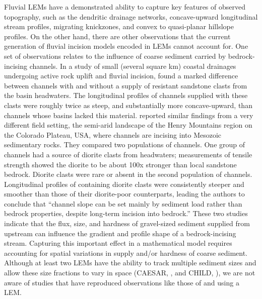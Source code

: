 \documentclass[journal abbreviation, manuscript]{copernicus}
\begin{document}
Fluvial LEMs have a demonstrated ability to capture key features of observed topography, such as the  dendritic drainage networks, concave-upward longitudinal stream profiles, migrating knickzones, and convex to quasi-planar hillslope profiles. On the other hand, there are other observations that the current generation of fluvial incision models encoded in LEMs cannot account for. One set of observations relates to the influence of coarse sediment carried by bedrock-incising channels. In a study of small (several square km) coastal drainages undergoing active rock uplift and fluvial incision, \citet{duvall2004tectonic} found a marked difference between channels with and without a supply of resistant sandstone clasts from the basin headwaters. The longitudinal profiles of channels supplied with these clasts were roughly twice as steep, and substantially more concave-upward, than channels whose basins lacked this material. \citet{johnson2009transport} reported similar findings from a very different field setting, the semi-arid landscape of the Henry Mountains region on the Colorado Plateau, USA, where channels are incising into Mesozoic sedimentary rocks. They compared two populations of channels. One group of channels had a source of diorite clasts from headwaters; measurements of tensile strength showed the diorite to be about 100x stronger than local sandstone bedrock. Diorite clasts were rare or absent in the second population of channels. Longitudinal profiles of  containing diorite clasts were consistently steeper and smoother than those of their diorite-poor counterparts, leading the authors to conclude that ``channel slope can be set mainly by sediment load rather than bedrock properties, despite long-term incision into bedrock.'' These two studies indicate that the flux, size, and hardness of gravel-sized sediment supplied from upstream can influence the gradient and profile shape of a bedrock-incising stream. Capturing this important effect in a mathematical model requires accounting for spatial variations in supply and/or hardness of coarse sediment. Although at least two LEMs have the ability to track multiple sediment sizes and allow these size fractions to vary in space (CAESAR, \citet{coulthard1996cellular}, and CHILD, \citet{tucker2001channel}), we are not aware of studies that have reproduced observations like those of \citet{duvall2004tectonic} and \citet{johnson2009transport} using a LEM.
\end{document}
